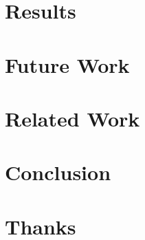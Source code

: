\documentclass[10pt, conference, compsocconf]{IEEEtran}
\begin{document}
\section{Results}\label{sec:results}

\section{Future Work}\label{sec:future}

\section{Related Work}\label{sec:related}

\section{Conclusion}\label{sec:conclusion}

\section{Thanks}



\end{document}
